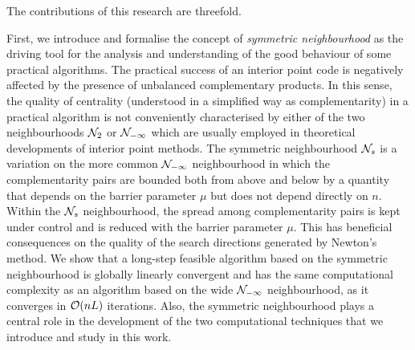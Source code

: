 The contributions of this research are threefold.

First, we introduce and formalise the concept of 
{\em symmetric neighbourhood} as the
driving tool for the analysis and understanding of the good behaviour
of some practical algorithms. 
The practical success of an interior point code is negatively
affected by the presence of unbalanced complementary products.
In this sense, 
the quality of centrality (understood in a simplified way 
as complementarity) in a practical algorithm is not 
conveniently characterised by either of the two neighbourhoods 
$\mathcal{N}_2$ or $\mathcal{N}_{-\infty}$ which are usually employed in 
theoretical developments of interior point methods.
The symmetric neighbourhood $\mathcal{N}_s$ is a variation on the more common
$\mathcal{N}_{-\infty}$ neighbourhood in which the complementarity pairs
are bounded both from above and below by a quantity 
that depends on the barrier parameter $\mu$ but does
not depend directly on $n$.
Within the $\mathcal{N}_s$ neighbourhood, the spread among 
complementarity pairs is kept
under control and is reduced with the barrier parameter $\mu$.
This has beneficial consequences on the quality of the search
directions generated by Newton's method. We show that
a long-step feasible algorithm based on the symmetric neighbourhood
is globally linearly convergent and
has the same computational complexity as an algorithm based
on the wide $\mathcal{N}_{-\infty}$ neighbourhood, as it
converges in $\mathcal{O}(nL)$ iterations.
Also, the symmetric neighbourhood plays a central role in the development 
of the two computational techniques that we introduce and study in this work.

